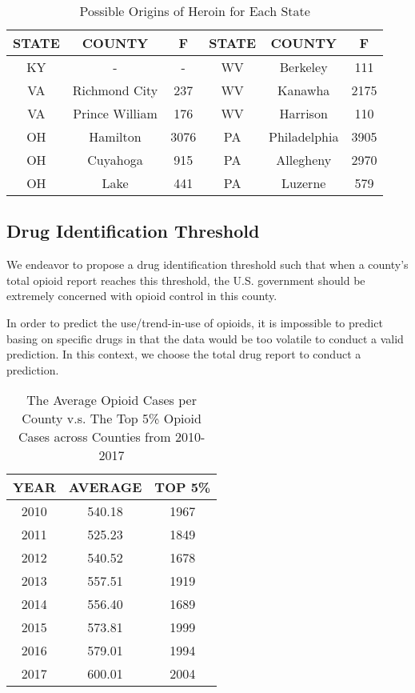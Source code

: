 \begin{table}[H]
	\centering
	\begin{tabular}{|c|c|c||c|c|c|}
		\hline
		\rowcolor[HTML]{656565} 
		{\color[HTML]{FFFFFF} \textbf{STATE}} & {\color[HTML]{FFFFFF} \textbf{COUNTY}} & {\color[HTML]{FFFFFF} \textbf{F}} &{\color[HTML]{FFFFFF} \textbf{STATE}} & {\color[HTML]{FFFFFF} \textbf{COUNTY}} & {\color[HTML]{FFFFFF} \textbf{F}}\\ \hline
		KY & - & - &WV & Berkeley & 111 \\ \hline
		VA & Richmond City & 237 &WV & Kanawha & 2175\\ \hline
		VA & Prince William & 176 & WV& Harrison&110 \\ \hline
		OH & Hamilton & 3076 &PA & Philadelphia & 3905 \\ \hline
		OH & Cuyahoga & 915 & PA & Allegheny & 2970 \\ \hline
		OH & Lake & 441 & PA & Luzerne & 579\\ \hline
	\end{tabular}
	\centering
	\caption{Possible Origins of Heroin for Each State}
\end{table}

\subsection{Drug Identification Threshold}
We endeavor to propose a drug identification threshold such that when a county's total opioid report reaches this threshold, the U.S. government should be extremely concerned with opioid control in this county.

In order to predict the use/trend-in-use of opioids, it is impossible to predict basing on specific drugs in that the data would be too volatile to conduct a valid prediction. In this context, we choose the total drug report to conduct a prediction.

\begin{table}[H]
\centering
\begin{tabular}{|c|c|c|}
\hline
\rowcolor[HTML]{656565} 
{\color[HTML]{FFFFFF} \textbf{YEAR}} & {\color[HTML]{FFFFFF} \textbf{AVERAGE}} & {\color[HTML]{FFFFFF} \textbf{TOP 5\%}} \\ \hline
2010 & 540.18 & 1967 \\ \hline
2011 & 525.23 & 1849 \\ \hline
2012 & 540.52 & 1678 \\ \hline
2013 & 557.51 & 1919 \\ \hline
2014 & 556.40 & 1689 \\ \hline
2015 & 573.81 & 1999 \\ \hline
2016 & 579.01 & 1994 \\ \hline
2017 & 600.01 & 2004 \\ \hline
\end{tabular}
\centering
\caption{The Average Opioid Cases per County v.s. The Top 5\% Opioid Cases across Counties from 2010-2017}
\end{table}

